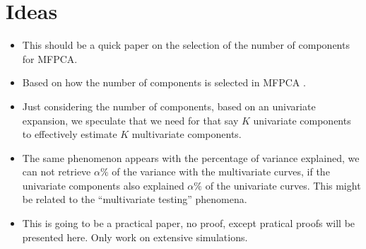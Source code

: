 \section{Ideas} %
\label{sec:ideas}

\begin{itemize}
    \item This should be a quick paper on the selection of the number of components for MFPCA.
    \item Based on how the number of components is selected in MFPCA \cite{happMultivariateFunctionalPrincipal2018a}.
    \item Just considering the number of components, based on an univariate expansion, we speculate that we need for that say $K$ univariate components to effectively estimate $K$ multivariate components.
    \item The same phenomenon appears with the percentage of variance explained, we can not retrieve $\alpha\%$ of the variance with the multivariate curves, if the univariate components also explained $\alpha\%$ of the univariate curves. This might be related to the ``multivariate testing'' phenomena.
    \item This is going to be a practical paper, no proof, except pratical proofs will be presented here. Only work on extensive simulations.
\end{itemize}

